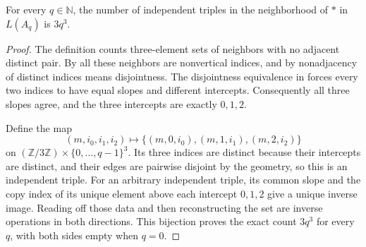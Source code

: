 \begin{lemma}
For every $q\in\mathbb N$, the number of independent triples in the
neighborhood of $\ast$ in $L(A_q)$ is $3q^3$.
\end{lemma}
\begin{proof}
The definition  counts three-element sets
of neighbors with no adjacent distinct pair. By
 all these neighbors are nonvertical
indices, and by  nonadjacency of distinct
indices means disjointness. The disjointness equivalence in
 forces every two indices to have equal
slopes and different intercepts. Consequently all three slopes agree,
and the three intercepts are exactly $0,1,2$.

Define the map
\[
(m,i_0,i_1,i_2)\longmapsto
\{(m,0,i_0),(m,1,i_1),(m,2,i_2)\}
\]
on $(\mathbb Z/3\mathbb Z)\times\{0,\ldots,q-1\}^3$.
Its three indices are distinct because their intercepts are distinct,
and their edges are pairwise disjoint by the geometry, so this is an
independent triple. For an arbitrary independent triple, its common slope
and the copy index of its unique element above each intercept $0,1,2$
give a unique inverse image. Reading off those data and then reconstructing
the set are inverse operations in both directions. This bijection proves
the exact count $3q^3$ for every $q$, with both sides empty when $q=0$.
\end{proof}
